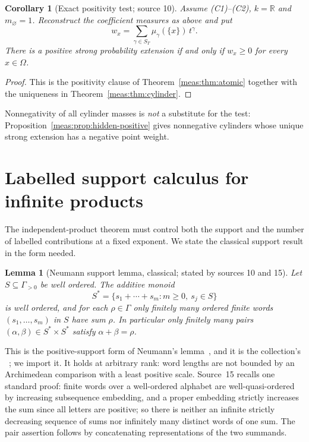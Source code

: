 \documentclass[11pt]{article}
\numberwithin{equation}{section}
\newtheorem{lemma}[theorem]{Lemma}
\newtheorem{corollary}[theorem]{Corollary}
\theoremstyle{definition}
\theoremstyle{remark}
\newcommand{\R}{\mathbb R}
\begin{document}
\begin{corollary}[Exact positivity test; source 10]\label{meas:cor:positive-test}
Assume (C1)--(C2), $k=\R$ and $m_\varnothing=1$. Reconstruct the coefficient
measures as above and put
\begin{equation}\label{meas:eq:reconstructed-atoms}
 w_x=\sum_{\gamma\in S_T}\mu_\gamma(\{x\})\,t^\gamma.
\end{equation}
There is a positive strong probability extension if and only if $w_x\ge0$ for
every $x\in\Omega$.
\end{corollary}
\begin{proof}
This is the positivity clause of Theorem~\ref{meas:thm:atomic} together with
the uniqueness in Theorem~\ref{meas:thm:cylinder}.
\end{proof}

Nonnegativity of all cylinder masses is \emph{not} a substitute for the test:
Proposition~\ref{meas:prop:hidden-positive} gives nonnegative cylinders whose
unique strong extension has a negative point weight.

\section{Labelled support calculus for infinite products}\label{meas:sec:neumann}

The independent-product theorem must control both the support and the number
of labelled contributions at a fixed exponent. We state the classical support
result in the form needed.

\begin{lemma}[Neumann support lemma, classical; stated by sources 10 and 15]
\label{meas:lem:neumann}
Let $S\subseteq\Gamma_{>0}$ be well ordered. The additive monoid
\[
 S^*=\{s_1+\cdots+s_m:m\ge0,\ s_j\in S\}
\]
is well ordered, and for each $\rho\in\Gamma$ only finitely many ordered finite
words $(s_1,\ldots,s_m)$ in $S$ have sum $\rho$. In particular only finitely
many pairs $(\alpha,\beta)\in S^*\times S^*$ satisfy $\alpha+\beta=\rho$.
\end{lemma}

This is the positive-support form of Neumann's lemma~\cite{Neumann}, and it is
the collection's ~\cite{repofound}; we import
it. It holds at arbitrary rank: word lengths are not bounded by an Archimedean
comparison with a least positive scale. Source~15 recalls one standard proof:
finite words over a well-ordered alphabet are well-quasi-ordered by increasing
subsequence embedding, and a proper embedding strictly increases the sum since
all letters are positive; so there is neither an infinite strictly decreasing
sequence of sums nor infinitely many distinct words of one sum. The pair
assertion follows by concatenating representations of the two summands.
\end{document}
